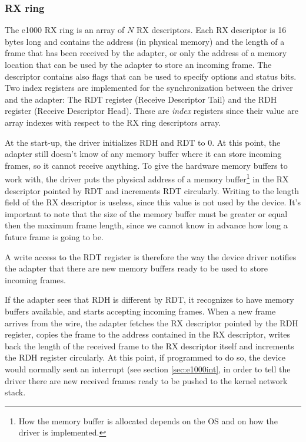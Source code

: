 \subsubsection{RX ring}
The e1000 RX ring is an array of $N$ RX descriptors. Each RX descriptor is 16 bytes long and contains the address (in physical 
memory) and the length of a frame that has been received by the adapter, or only the address of a memory location that can be
used by the adapter to store an incoming frame. The descriptor contains also flags that can be used to specify options and status bits.
Two index registers are implemented for the synchronization between the driver and the adapter:
The RDT register (Receive Descriptor Tail) and the RDH register (Receive Descriptor Head). These are \emph{index} registers since
their value are array indexes with respect to the RX ring descriptors array.

At the start-up, the driver initializes RDH and RDT to 0. At this point, the adapter still doesn't know of any memory buffer where it
can store incoming frames, so it cannot receive anything.
To give the hardware memory buffers to work with, the driver puts the physical address of a memory buffer\footnote{How the memory 
buffer is allocated depends on the OS and on how the driver is implemented.} in the RX descriptor pointed by RDT and increments 
RDT circularly. Writing to the length field of the RX descriptor is useless, since this value is not used by the device. It's important to note
that the size of the memory buffer must be greater or equal then the maximum frame length, since we cannot know in advance how long
a future frame is going to be.

A write access to the RDT register is therefore the way the device driver notifies the adapter that there are new memory buffers ready
to be used to store incoming frames.

If the adapter sees that RDH is different by RDT, it recognizes to have memory buffers available, and starts accepting incoming frames.
When a new frame arrives from the wire, the adapter fetches the RX descriptor pointed by the RDH register, copies the frame to the address
contained in the RX descriptor, writes back the length of the received frame to the RX descriptor itself and increments the RDH register
circularly.
At this point, if programmed to do so, the device would normally sent an interrupt (see section \ref{sec:e1000int}, in order to tell
the driver there are new received frames ready to be pushed to the kernel network stack.

